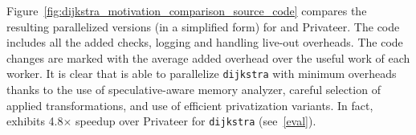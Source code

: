 Figure~\ref{fig:dijkstra_motivation_comparison_source_code} compares the
resulting parallelized versions (in a simplified form) for \name and
Privateer. The code includes all the added checks, logging and handling
live-out overheads. The code changes are marked with the average added
overhead over the useful work of each worker. It is clear that \name is
able to parallelize \texttt{dijkstra} with minimum overheads thanks to the
use of speculative-aware memory analyzer, careful selection of applied
transformations, and use of efficient privatization variants. In fact,
\name exhibits 4.8$\times$ speedup over Privateer for \texttt{dijkstra}
(see~\ref{eval}).

%
%
%
%
%
%
